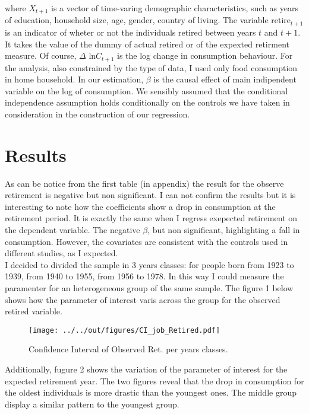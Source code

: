 \documentclass[11pt, a4paper, leqno]{article}
\begin{document}
where $X_{t+1}$ is a vector of time-varing demographic characteristics, such as years of education, household size, age, gender, country of living. The variable retire$_{t+1}$ is an indicator of wheter or not the individuals retired between years $t$ and $t+1$. It takes the value of the dummy of actual retired or of the expexted retirment measure. Of course, $\Delta$ ln$C_{t+1}$ is the log change in consumption behaviour. For the analysis, also constrained by the type of data, I used only food consumption in home household. In our estimation, $\beta$ is the causal effect of main indipendent variable on the log of consumption. We sensibly assumed that the conditional independence assumption holds conditionally on the controls we have taken in consideration in the construction of our regression.

\section{Results}
\label{sec:results}

As can be notice from the first table (in appendix) the result for the observe retirement is negative but non significant. I can not confirm the results but it is interesting to note how the coefficients show a drop in consumption at the retirement period. It is exactly the same when I regress exepected retirement on the dependent variable. The negative $\beta$, but non significant, highlighting a fall in consumption. However, the covariates are consistent with the controls used in different studies, as I expected.
\\\hspace*{4mm} I decided to divided the sample in 3 years classes: for people born from 1923 to 1939, from 1940 to 1955, from 1956 to 1978. In this way I could measure the paramenter for an  heterogeneous group of the same sample. The figure 1  below shows how the parameter of interest varis across the group for the observed retired variable.
\begin{figure}[h]
\centering
\texttt{[image: ../../out/figures/CI\_job\_Retired.pdf]}
\caption{Confidence Interval of Observed Ret. per years classes.}
\end{figure}

Additionally, fugure 2 shows the variation of the parameter of interest for the expected retirement year. The two figures reveal that the drop in consumption for the oldest individuals is more drastic than the youngest ones. The middle group display a similar pattern to the youngest group.
\end{document}
